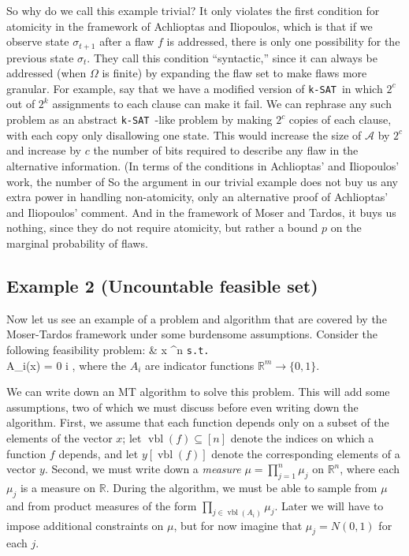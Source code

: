 \documentclass{article}
\newcommand{\ksat}{\texttt{k-SAT}~}
\def\seqn#1\eeqn{\begin{align}#1\end{align}}
\newcommand{\Reals}%
  {\mathbb{R}}
\begin{document}
So why do we call this example trivial?  It only violates the first condition for atomicity in the framework of Achlioptas and Iliopoulos, which is that if we observe state $\sigma_{t+1}$ after a flaw $f$ is addressed, there is only one possibility for the previous state $\sigma_t$.  They call this condition ``syntactic,'' since it can always be addressed (when $\Omega$ is finite) by expanding the flaw set to make flaws more granular.  For example, say that we have a modified version of \ksat in which $2^c$ out of $2^k$ assignments to each clause can make it fail.  We can rephrase any such problem as an abstract \ksat-like problem by making $2^c$ copies of each clause, with each copy only disallowing one state.  This would increase the size of $\mathcal{A}$ by $2^c$ and increase by $c$ the number of bits required to describe any flaw in the alternative information.  (In terms of the conditions in Achlioptas' and Iliopoulos' work, the number of %
So the argument in our trivial example does not buy us any extra power in handling non-atomicity, only an alternative proof of Achlioptas' and Iliopoulos' comment.  And in the framework of Moser and Tardos, it buys us nothing, since they do not require atomicity, but rather a bound $p$ on the marginal probability of flaws.

\subsection{Example 2 (Uncountable feasible set)}
\label{subsec:uncountable}
Now let us see an example of a problem and algorithm that are covered by the Moser-Tardos framework under some burdensome assumptions.  Consider the following feasibility problem:
\seqn
  \label{prob:feas}
   & x \in \Reals^n \texttt{s.t.} \\
  A_i(x) = 0 \forall i \in [m] ,
\eeqn
where the $A_i$ are indicator functions $\Reals^{m} \to \{0,1\}$.

We can write down an MT algorithm to solve this problem.  This will add some assumptions, two of which we must discuss before even writing down the algorithm.  First, we assume that each function depends only on a subset of the elements of the vector $x$; let $\operatorname{vbl}(f) \subseteq [n]$ denote the indices on which a function $f$ depends, and let $y[\operatorname{vbl}(f)]$ denote the corresponding elements of a vector $y$.  Second, we must write down a \emph{measure} $\mu = \prod_{j=1}^{n} \mu_j$ on $\Reals^n$, where each $\mu_j$ is a measure on $\Reals$.  During the algorithm, we must be able to sample from $\mu$ and from product measures of the form $\prod_{j \in \operatorname{vbl}(A_i)} \mu_j$.  Later we will have to impose additional constraints on $\mu$, but for now imagine that $\mu_j = N(0, 1)$ for each $j$.
\end{document}
